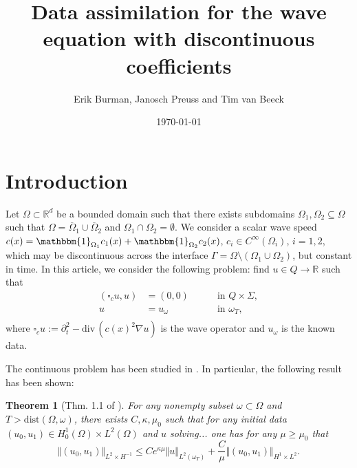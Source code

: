 \documentclass[10pt,reqno]{amsart}
\title{Data assimilation for the wave equation with discontinuous coefficients}
\author{Erik Burman, Janosch Preuss and Tim van Beeck}
\date{\today}
\newtheorem{thm}{Theorem}[section]
\numberwithin{equation}{section}
\renewcommand{\div}{\mathrm{div}\,}  %
\newcommand{\wop}{\square_c}
\begin{document}
\maketitle

\section{Introduction}
\noindent Let $\Omega \subset \mathbb{R}^d$ be a bounded domain such that there exists subdomains $\Omega_1, \Omega_2 \subseteq \Omega$ such that $\Omega = \overline{\Omega}_1 \cup \overline{\Omega}_2$ and $\Omega_1 \cap \Omega_2 = \emptyset$. We consider a scalar wave speed $c(x) = \mathbbm{1}_{\Omega_1} c_1(x) + \mathbbm{1}_{\Omega_2} c_2(x)$, $c_i \in C^\infty(\Omega_i)$, $i = 1,2$, which may be discontinuous across the interface $\Gamma = \Omega \setminus (\Omega_1 \cup \Omega_2)$, but constant in time.  
\noindent In this article, we consider the following problem: find $u \in Q \rightarrow \mathbb{R}$ such that 
\begin{subequations}
    \begin{alignat}{2}
        (\wop u, u) &= (0,0) \quad &&\text{ in } Q \times \Sigma, \label{eq:waveEquation} \\ 
        u &= u_{\omega} &&\text{ in } \omega_T, \\ \label{eq:DataMatch}
    \end{alignat}    
\end{subequations}
where $\wop u := \partial_t^2 - \div(c(x)^2 \nabla u)$ is the wave operator and $u_{\omega}$ is the known data. 

\noindent The continuous problem has been studied in \cite{Filippas22}. In particular, the following result has been shown:
\begin{thm}[Thm. 1.1 of \cite{Filippas22}]\label{thm:filippas}
    For any nonempty subset $\omega \subset \Omega$ and $T > \text{dist}(\Omega,\omega)$, there exists $C,\kappa,\mu_0$ such that for any initial data $(u_0,u_1) \in H^1_0(\Omega) \times L^2(\Omega)$ and $u$ solving... one has for any $\mu \ge \mu_0$ that 
    \begin{equation}
        \Vert (u_0,u_1) \Vert_{L^2 \times H^{-1}} \le C e^{\kappa \mu} \Vert u \Vert_{L^2(\omega_T)} + \frac{C}{\mu} \Vert (u_0,u_1) \Vert_{H^1 \times L^2}. 
    \end{equation}
\end{thm}
\end{document}
